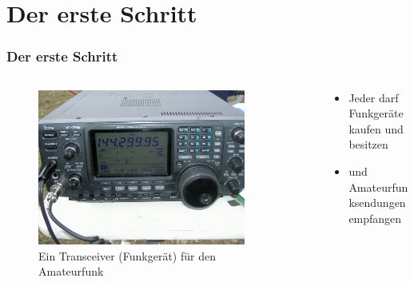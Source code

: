 
\section{Der erste Schritt}
\label{section:erste_schritte}
\begin{frame}%

\frametitle{Der erste Schritt}
\begin{columns}
    \begin{column}{0.48\textwidth}
    
\begin{figure}
    \includegraphics[width=0.85\textwidth]{foto/117}
    \caption{\scriptsize Ein Transceiver (Funkgerät) für den Amateurfunk}
    \label{n_erste_schritte_transceiver}
\end{figure}

    \end{column}
   \begin{column}{0.48\textwidth}
       \begin{itemize}
  \item Jeder darf Funkgeräte kaufen und besitzen
  \item und Amateurfunksendungen empfangen
  \end{itemize}

   \end{column}
\end{columns}

\end{frame}


